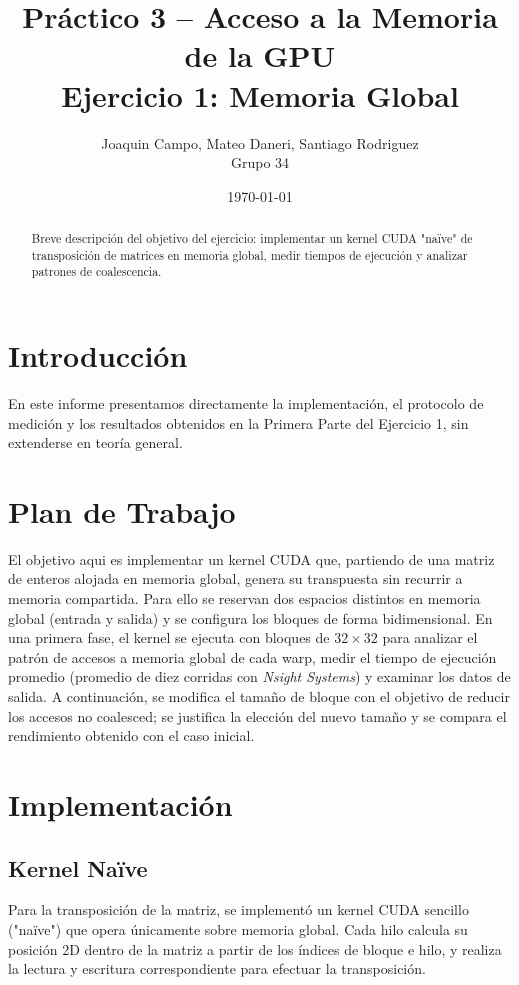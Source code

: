 \documentclass[a4paper,11pt]{article}
\title{Práctico 3 -- Acceso a la Memoria de la GPU\\Ejercicio 1: Memoria Global}
\author{Joaquin Campo, Mateo Daneri, Santiago Rodriguez \\ Grupo 34}
\date{\today}
\begin{document}
\maketitle

\begin{abstract}
Breve descripción del objetivo del ejercicio: implementar un kernel CUDA "naïve" de transposición de matrices en memoria global, medir tiempos de ejecución y analizar patrones de coalescencia.
\end{abstract}

\section{Introducción}
En este informe presentamos directamente la implementación, el protocolo de medición y los resultados obtenidos en la Primera Parte del Ejercicio 1, sin extenderse en teoría general.

\section{Plan de Trabajo}
El objetivo aqui es implementar un kernel CUDA que, partiendo de una matriz de enteros alojada en memoria global, genera su transpuesta sin recurrir a memoria compartida. Para ello se reservan dos espacios distintos en memoria global (entrada y salida) y se configura los bloques de forma bidimensional. En una primera fase, el kernel se ejecuta con bloques de $32\times 32$ para analizar el patrón de accesos a memoria global de cada warp, medir el tiempo de ejecución promedio (promedio de diez corridas con \textit{Nsight Systems}) y examinar los datos de salida. A continuación, se modifica el tamaño de bloque con el objetivo de reducir los accesos no coalesced; se justifica la elección del nuevo tamaño y se compara el rendimiento obtenido con el caso inicial.

\section{Implementación}
\subsection{Kernel Naïve}
Para la transposición de la matriz, se implementó un kernel CUDA sencillo ("naïve") que opera únicamente sobre memoria global. Cada hilo calcula su posición 2D dentro de la matriz a partir de los índices de bloque e hilo, y realiza la lectura y escritura correspondiente para efectuar la transposición.
\end{document}

